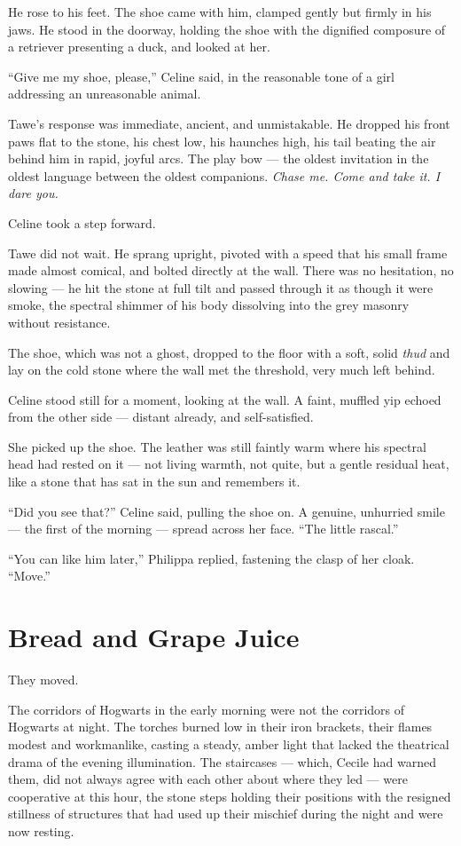 He rose to his feet. The shoe came with him, clamped gently but firmly in his jaws. He stood in the doorway, holding the shoe with the dignified composure of a retriever presenting a duck, and looked at her.

\enquote{Give me my shoe, please,} Celine said, in the reasonable tone of a girl addressing an unreasonable animal.

Tawe's response was immediate, ancient, and unmistakable. He dropped his front paws flat to the stone, his chest low, his haunches high, his tail beating the air behind him in rapid, joyful arcs. The play bow --- the oldest invitation in the oldest language between the oldest companions. \textit{Chase me. Come and take it. I dare you.}

Celine took a step forward.

Tawe did not wait. He sprang upright, pivoted with a speed that his small frame made almost comical, and bolted directly at the wall. There was no hesitation, no slowing --- he hit the stone at full tilt and passed through it as though it were smoke, the spectral shimmer of his body dissolving into the grey masonry without resistance.

The shoe, which was not a ghost, dropped to the floor with a soft, solid \textit{thud} and lay on the cold stone where the wall met the threshold, very much left behind.

Celine stood still for a moment, looking at the wall. A faint, muffled yip echoed from the other side --- distant already, and self-satisfied.

She picked up the shoe. The leather was still faintly warm where his spectral head had rested on it --- not living warmth, not quite, but a gentle residual heat, like a stone that has sat in the sun and remembers it.

\enquote{Did you see that?} Celine said, pulling the shoe on. A genuine, unhurried smile --- the first of the morning --- spread across her face. \enquote{The little rascal.}

\enquote{You can like him later,} Philippa replied, fastening the clasp of her cloak. \enquote{Move.}

\section*{Bread and Grape Juice}

They moved.

The corridors of Hogwarts in the early morning were not the corridors of Hogwarts at night. The torches burned low in their iron brackets, their flames modest and workmanlike, casting a steady, amber light that lacked the theatrical drama of the evening illumination. The staircases --- which, Cecile had warned them, did not always agree with each other about where they led --- were cooperative at this hour, the stone steps holding their positions with the resigned stillness of structures that had used up their mischief during the night and were now resting.


